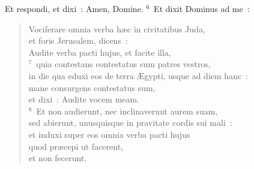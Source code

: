  Et respondi, et dixi~: Amen, Domine.
${}^{6}$~Et dixit Dominus ad me~: \begin{flushleft}\begin{verse}Vociferare omnia verba h\ae c in civitatibus Juda,\\ et foris Jerusalem, dicens~:\\ Audite verba pacti hujus, et facite illa,\\
${}^{7}$~quia contestans contestatus sum patres vestros,\\ in die qua eduxi eos de terra \AE gypti, usque ad diem hanc~:\\ mane consurgens contestatus sum,\\ et dixi~: Audite vocem meam.\\
${}^{8}$~Et non audierunt, nec inclinaverunt aurem suam,\\ sed abierunt, unusquisque in pravitate cordis sui mali~:\\ et induxi super eos omnia verba pacti hujus\\ quod pr\ae cepi ut facerent,\\ et non fecerunt.\end{verse}\end{flushleft}


